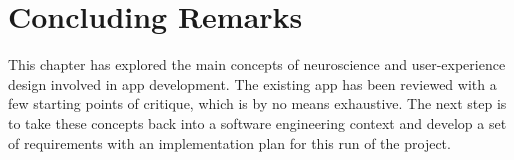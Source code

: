 \section{Concluding Remarks}
This chapter has explored the main concepts of neuroscience and user-experience design involved in app development. The existing app has been reviewed with a few starting points of critique, which is by no means exhaustive. The next step is to take these concepts back into a software engineering context and develop a set of requirements with an implementation plan for this run of the project.